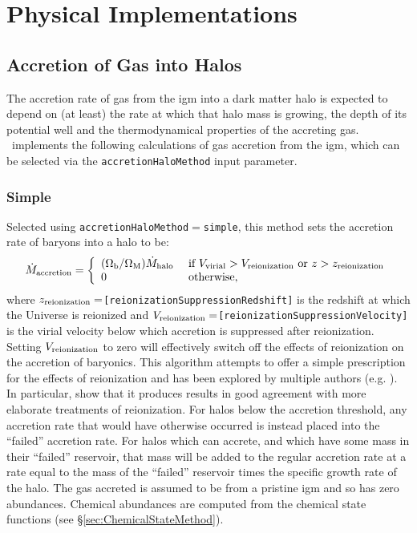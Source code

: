 \chapter{Physical Implementations}

\section{Accretion of Gas into Halos}\label{sec:AccretionBaryonic}

The accretion rate of gas from the \gls{igm} into a dark matter halo is expected to depend on (at least) the rate at which that halo mass is growing, the depth of its potential well and the thermodynamical properties of the accreting gas. \glc\ implements the following calculations of gas accretion from the \gls{igm}, which can be selected via the {\tt accretionHaloMethod} input parameter.

\subsection{Simple}\label{phys:accretionHalo:accretionHaloSimple}

Selected using {\tt accretionHaloMethod}$=${\tt simple}, this method sets the accretion rate of baryons into a halo to be:
\begin{equation}
 \dot{M}_{\rm accretion} = \left\{ \begin{array}{ll} (\Omega_{\rm b}/\Omega_{\rm M}) \dot{M}_{\rm halo} & \hbox{ if } V_{\rm virial} > V_{\rm reionization} \hbox{ or } z > z_{\rm reionization} \\ 0 & \hbox{ otherwise,}\end{array} \right.
\label{eq:accretionHalo:truncation}
\end{equation}
where $z_{\rm reionization}=${\tt [reionizationSuppressionRedshift]} is the redshift at which the Universe is reionized and $V_{\rm reionization}=${\tt [reionizationSuppressionVelocity]} is the virial velocity below which accretion is suppressed after reionization. Setting $V_{\rm reionization}$ to zero will effectively switch off the effects of reionization on the accretion of baryonics. This algorithm attempts to offer a simple prescription for the effects of reionization and has been explored by multiple authors (e.g. \citealt{benson_effects_2002}). In particular, \cite{font_modelingmilky_2010} show that it produces results in good agreement with more elaborate treatments of reionization. For halos below the accretion threshold, any accretion rate that would have otherwise occurred is instead placed into the ``failed'' accretion rate. For halos which can accrete, and which have some mass in their ``failed'' reservoir, that mass will be added to the regular accretion rate at a rate equal to the mass of the 
``failed'' reservoir times the specific growth rate of the halo. The gas accreted is assumed to be from a pristine \gls{igm} and so has zero abundances. Chemical abundances are computed from the chemical state functions (see \S\ref{sec:ChemicalStateMethod}).

